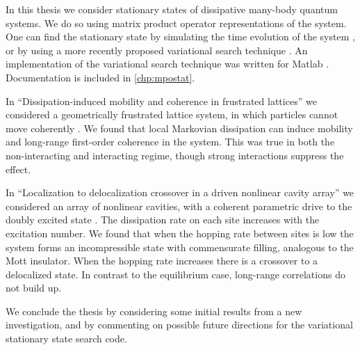 In this thesis we consider stationary states of dissipative many-body quantum systems. We do so using matrix product operator representations of the system. One can find the stationary state by simulating the time evolution of the system \cite{Vidal2004,Schollwock2011}, or by using a more recently proposed variational search technique \cite{Cui2015,Mascarenhas2015}. An implementation of the variational search technique was written for Matlab \cite{otb:gitVSSS,MATLAB}. Documentation is included in \cref{chp:mpostat}.

In ``Dissipation-induced mobility and coherence in frustrated lattices'' we considered a geometrically frustrated lattice system, in which particles cannot move coherently \cite{Owen2017}. We found that local Markovian dissipation can induce mobility and long-range first-order coherence in the system. This was true in both the non-interacting and interacting regime, though strong interactions suppress the effect.

In ``Localization to delocalization crossover in a driven nonlinear cavity array'' we considered an array of nonlinear cavities, with a coherent parametric drive to the doubly excited state \cite{Brown2018}. The dissipation rate on each site increases with the excitation number. We found that when the hopping rate between sites is low the system forms an incompressible state with commensurate filling, analogous to the Mott insulator. When the hopping rate increases there is a crossover to a delocalized state. In contrast to the equilibrium case, long-range correlations do not build up.

We conclude the thesis by considering some initial results from a new investigation, and by commenting on possible future directions for the variational stationary state search code.